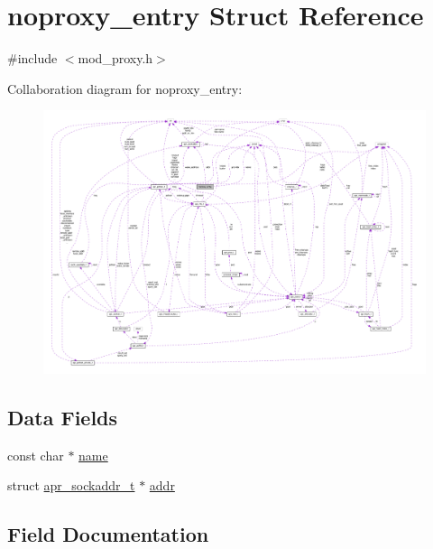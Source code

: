 \hypertarget{structnoproxy__entry}{}\section{noproxy\+\_\+entry Struct Reference}
\label{structnoproxy__entry}


{\ttfamily \#include $<$mod\+\_\+proxy.\+h$>$}



Collaboration diagram for noproxy\+\_\+entry\+:
\nopagebreak
\begin{figure}[H]
\begin{center}
\leavevmode
\includegraphics[width=350pt]{structnoproxy__entry__coll__graph}
\end{center}
\end{figure}
\subsection*{Data Fields}
\begin{DoxyCompactItemize}
\item 
const char $\ast$ \hyperlink{structnoproxy__entry_a579cae065408f00adde1bb78d09fb339}{name}
\item 
struct \hyperlink{structapr__sockaddr__t}{apr\+\_\+sockaddr\+\_\+t} $\ast$ \hyperlink{structnoproxy__entry_a5d7a8b77b9f4d5b1be6c266ba8d31670}{addr}
\end{DoxyCompactItemize}


\subsection{Field Documentation}
